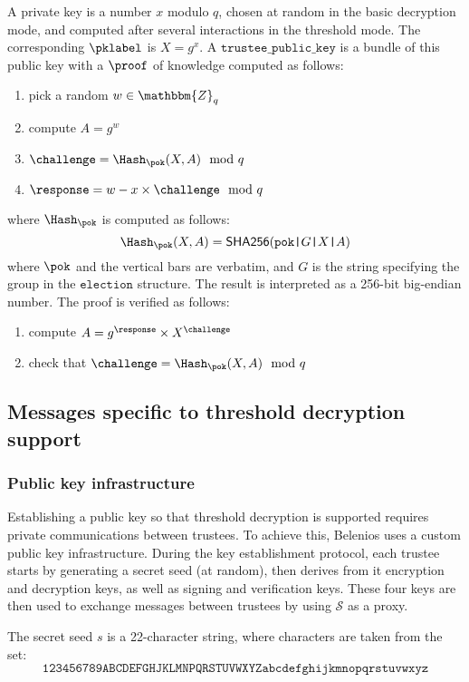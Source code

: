 \documentclass[a4paper]{article}
\newcommand{\Z}{\mathbbm{Z}}
\newcommand{\shatwo}{\textsf{SHA256}}
\newcommand{\tpk}{\texttt{trustee\_public\_key}}
\newcommand{\election}{\texttt{election}}
\begin{document}
A private key is a number $x$ modulo $q$, chosen at random in the
basic decryption mode, and computed after several interactions in the
threshold mode.
The corresponding
$\pklabel$ is $X=g^x$. A $\tpk$ is a bundle of this public key with a
\hyperref[common]{$\proof$} of knowledge computed as follows:
\begin{enumerate}
\item pick a random $w\in\Z_q$
\item compute $A=g^w$
\item $\challenge=\Hash_\pok(X,A)\mod q$
\item $\response=w-x\times\challenge\mod q$
\end{enumerate}
where $\Hash_\pok$ is computed as follows:
\[\Hash_\pok(X,A) = \shatwo(\verb=pok|=G\verb=|=X\verb=|=A) \]
where $\pok$ and the vertical bars are verbatim,
and $G$ is the string specifying the group in the
$\election$ structure. The result is interpreted as a 256-bit
big-endian number. The proof is verified as follows:
\begin{enumerate}
\item compute $A={g^\response}\times{X^\challenge}$
\item check that $\challenge=\Hash_\pok(X,A)\mod q$
\end{enumerate}

\subsection{Messages specific to threshold decryption support}
\label{threshold}

\subsubsection{Public key infrastructure}
\label{pki}

Establishing a public key so that threshold decryption is supported
requires private communications between trustees. To achieve this,
Belenios uses a custom public key infrastructure. During the key
establishment protocol, each trustee starts by generating a secret
seed (at random), then derives from it encryption and decryption keys,
as well as signing and verification keys. These four keys are then
used to exchange messages between trustees by using $\mathcal{S}$ as a proxy.

The secret seed $s$ is a 22-character string, where characters are
taken from the set:
\[\texttt{123456789ABCDEFGHJKLMNPQRSTUVWXYZabcdefghijkmnopqrstuvwxyz}\]
\end{document}
